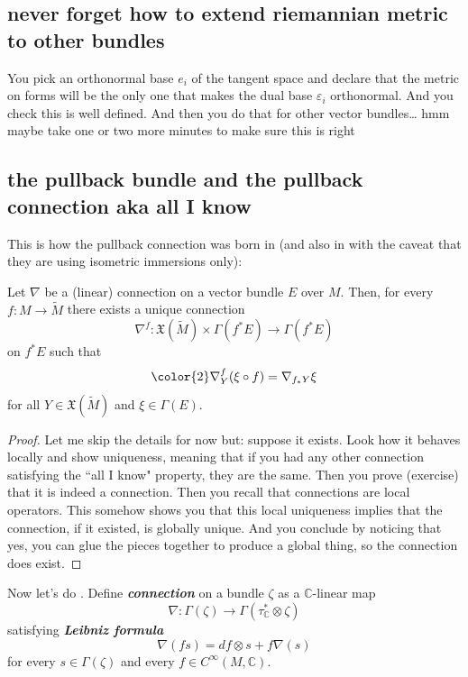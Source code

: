 \subsection{never forget how to extend riemannian metric to other bundles}

You pick an orthonormal base \(e_i\) of the tangent space and declare that the metric on forms will be the only one that makes the dual base \(\varepsilon_i\) orthonormal. And you check this is well defined. And then you do that for other vector bundles… hmm maybe take one or two more minutes to make sure this is right

\subsection{the pullback bundle and the pullback connection aka all I know}

This is how the pullback connection was born in \cite{au} (and also in \cite{daj} with the caveat that they are using isometric immersions only):

\begin{prop}\leavevmode
Let \(\nabla\) be a (linear) connection on a vector bundle \(E\) over \(M\). Then, for every \(f:M \to \widetilde{M}\) there exists a unique connection
\[\nabla^f:\mathfrak{X}(\widetilde{M}) \times \Gamma(f^*E) \longrightarrow \Gamma(f^*E)\]
on \(f^*E\) such that
\[{\color{2}\nabla^f_Y(\xi \circ f)=\nabla_{f_* Y}\xi}\]
for all \(Y \in \mathfrak{X}(\widetilde{M})\) and \(\xi \in \Gamma(E)\).
\end{prop}

\begin{proof}\leavevmode
Let me skip the details for now but: suppose it exists. Look how it behaves locally and show uniqueness, meaning that if you had any other connection satisfying the ``all I know" property, they are the same. Then you prove (exercise) that it is indeed a connection. Then you recall that connections are local operators. This somehow shows you that this local uniqueness implies that the connection, if it existed, is globally unique. And you conclude by noticing that yes, you can glue the pieces together to produce a global thing, so the connection does exist.
\end{proof}

Now let's do \cite{mc}. Define \textit{\textbf{connection}} on a bundle \(\zeta\) as a \(\mathbb{C}\)-linear map
\[\nabla:\Gamma(\zeta) \longrightarrow \Gamma(\tau_{\mathbb{C}}^* \otimes \zeta)\]
satisfying \textit{\textbf{Leibniz formula}} 
\[\nabla(fs)=df \otimes s +f \nabla(s)\]
for every \(s \in \Gamma(\zeta)\) and every \(f \in C^\infty(M,\mathbb{C})\).

